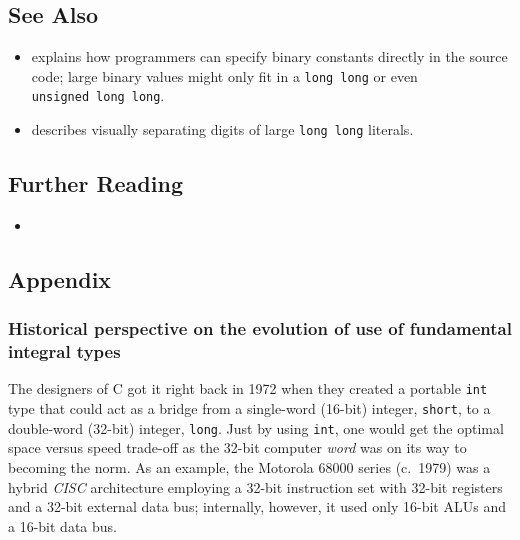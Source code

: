 \subsection[See Also]{See Also}\label{see-also}

\begin{itemize}
\item{explains how programmers can specify binary constants directly in the source code; large binary values might only fit in a \lstinline!long!~\lstinline!long! or even \lstinline!unsigned!~\lstinline!long!~\lstinline!long!.}
\item{describes visually separating digits of large \lstinline!long!~\lstinline!long! literals.}
\end{itemize}

\subsection[Further Reading]{Further Reading}\label{further-reading}

\begin{itemize}
\item{\cite{adamczyk05}}
\end{itemize}

\subsection[Appendix]{Appendix}\label{longlong-appendix}

\subsubsection[Historical perspective on the evolution of use of fundamental integral types]{Historical perspective on the evolution of use of fundamental integral types}
\label{historical-perspective-on-the-evolution-of-use-of-fundamental-integral-types}

The designers of C got it right back in 1972 when
they created a portable \lstinline!int! type that could act as a bridge
from a single-word (16-bit) integer, \lstinline!short!, to a double-word
(32-bit) integer, \lstinline!long!. Just by using \lstinline!int!, one would
get the optimal space versus speed trade-off as the 32-bit computer \emph{word}
was on its way to becoming the norm. As an example, the Motorola
68000 series (c.~1979) was a hybrid \emph{CISC} architecture employing
a 32-bit instruction set with 32-bit registers and a 32-bit external
data bus; internally, however, it used only 16-bit ALUs and a 16-bit
  data bus.

